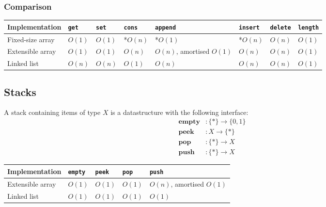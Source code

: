 \documentclass{article}
\begin{document}
\subsubsection{Comparison}

\begin{center}
	\begin{tabular}{ l | l | l | l | l | l | l | l }
		\textbf{Implementation}
		 & \texttt{get}
		 & \texttt{set}
		 & \texttt{cons}
		 & \texttt{append}
		 & \texttt{insert}
		 & \texttt{delete}
		 & \texttt{length}
		\\
		\hline
		Fixed-size array
		 & $O(1)$
		 & $O(1)$
		 & *$O(n)$
		 & *$O(1)$
		 & *$O(n)$
		 & $O(n)$
		 & $O(1)$
		\\
		\hline
		Extensible array
		 & $O(1)$
		 & $O(1)$
		 & $O(n)$
		 & $O(n)$, amortised $O(1)$
		 & $O(n)$
		 & $O(n)$
		 & $O(1)$
		\\
		\hline
		Linked list
		 & $O(n)$
		 & $O(n)$
		 & $O(1)$
		 & $O(n)$
		 & $O(n)$
		 & $O(n)$
		 & $O(1)$
	\end{tabular}
\end{center}

\subsection{Stacks}

\begin{definition}
	A stack containing items of type $X$ is a datastructure with
	the following interface:
	\begin{align*}
		\textbf{empty} & : \{*\}\to\{0, 1\} \\
		\textbf{peek}  & : X \to \{*\}      \\
		\textbf{pop}   & : \{*\}\to X       \\
		\textbf{push}  & : \{*\}\to X
	\end{align*}
\end{definition}

\begin{center}
	\begin{tabular}{ l | l | l | l | l}
		\textbf{Implementation}
		 & \texttt{empty}
		 & \texttt{peek}
		 & \texttt{pop}
		 & \texttt{push}
		\\
		\hline
		Extensible array
		 & $O(1)$
		 & $O(1)$
		 & $O(1)$
		 & $O(n)$, amortised $O(1)$
		\\
		\hline
		Linked list
		 & $O(1)$
		 & $O(1)$
		 & $O(1)$
		 & $O(1)$
	\end{tabular}
\end{center}
\end{document}
